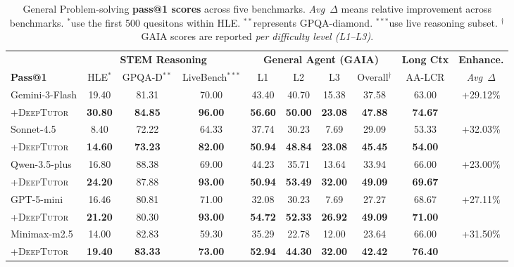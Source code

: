 \begin{table}[!t]
\centering
\caption{General Problem-solving \textbf{pass@1 scores} across five benchmarks.
\textit{Avg~$\Delta$} means relative improvement across benchmarks. 
$^*$use the first 500 quesitons within HLE.
$^{**}$represents GPQA-diamond. 
$^{***}$use live reasoning subset.
$^\dagger$GAIA scores are reported \textit{per difficulty level (L1--L3)}.}
\label{tab:generalization}
\small
\setlength{\tabcolsep}{5pt}
\begin{tabular}{l ccc cccc c c}
\toprule
& \multicolumn{3}{c}{\textbf{STEM Reasoning}} & \multicolumn{4}{c}{\textbf{General Agent (GAIA)}} & \textbf{Long Ctx} & \textbf{Enhance.} \\
\cmidrule(lr){2-4} \cmidrule(lr){5-8} \cmidrule(lr){9-9}
\textbf{Pass@1} & HLE$^*$ & GPQA-D$^{**}$ & LiveBench$^{***}$ & L1 & L2 & L3 & Overall$^\dagger$ & AA-LCR & \textit{Avg~$\Delta$} \\
\midrule
Gemini-3-Flash & 19.40 & 81.31 & 70.00 & 43.40 & 40.70 & 15.38 & 37.58 & 63.00 & \multirow{2}{*}{+29.12\%} \\
\quad+\textsc{DeepTutor} & \textbf{30.80} & \textbf{84.85} & \textbf{96.00} & \textbf{56.60} & \textbf{50.00} & \textbf{23.08} & \textbf{47.88} & \textbf{74.67} & \\
\midrule
Sonnet-4.5 & 8.40 & 72.22 & 64.33 & 37.74 & 30.23 & 7.69 & 29.09 & 53.33 & \multirow{2}{*}{+32.03\%} \\
\quad+\textsc{DeepTutor} & \textbf{14.60} & \textbf{73.23} & \textbf{82.00} & \textbf{50.94} & \textbf{48.84} & \textbf{23.08} & \textbf{45.45} & \textbf{54.00} & \\
\midrule
Qwen-3.5-plus & 16.80 & 88.38 & 69.00 & 44.23 & 35.71 & 13.64 & 33.94 & 66.00 & \multirow{2}{*}{+23.00\%} \\
\quad+\textsc{DeepTutor} & \textbf{24.20} & \textcolor{red!70!black}{87.88} & \textbf{93.00} & \textbf{50.94} & \textbf{53.49} & \textbf{32.00} & \textbf{49.09} & \textbf{69.67} & \\
\midrule
GPT-5-mini & 16.46 & 80.81 & 71.00 & 32.08 & 30.23 & 7.69 & 27.27 & 68.67 & \multirow{2}{*}{+27.11\%} \\
\quad+\textsc{DeepTutor} & \textbf{21.20} & \textcolor{red!70!black}{80.30} & \textbf{93.00} & \textbf{54.72} & \textbf{52.33} & \textbf{26.92} & \textbf{49.09} & \textbf{71.00} & \\
\midrule
Minimax-m2.5 & 14.00 & 82.83 & 59.30 & 35.29 & 22.78 & 12.00 & 23.64 & 66.00 & \multirow{2}{*}{+31.50\%} \\
\quad+\textsc{DeepTutor} & \textbf{19.40} & \textbf{83.33} & \textbf{73.00} & \textbf{52.94} & \textbf{44.30} & \textbf{32.00} & \textbf{42.42} & \textbf{76.40} & \\
\bottomrule
\end{tabular}
\end{table}

